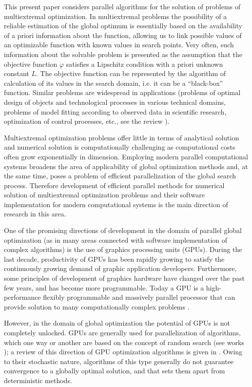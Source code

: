 \documentclass[smallcondensed]{svjour3}     %
\begin{document}
This present paper considers parallel algorithms for the solution of problems of multiextremal optimization. In multiextremal problems the possibility of a reliable estimation of the global optimum is essentially based on the availability of a priori information about the function, allowing us to link possible values of an optimizable function with known values in search points. Very often, such information about the solvable problem is presented as the assumption that the objective function $\varphi$ satisfies a Lipschitz condition with a priori unknown constant $L$. The objective function can be represented by the algorithm of calculation of its values in the search domain, i.e. it can be a ``black-box'' function. Similar problems are widespread in applications (problems of optimal design of objects and technological processes in various technical domains, problems of model fitting according to observed data in scientific research, optimization of control processes, etc., see the review \cite{RefPinter}).

Multiextremal optimization problems offer little in terms of analytical solution and numerical solution is computationally challenging as computational costs often grow exponentially in dimension. Employing modern parallel computational systems broadens the area of applicability of global optimization methods and, at the same time, poses a problem of efficient parallelization of the global search process. Therefore development of efficient parallel methods for numerical solution of multiextremal optimization problems and their software implementation for modern computational systems is the main direction of research in this area.

One of the promising directions of development in the domain of parallel global optimization (as in many areas connected with software implementation of complex algorithms) is the use of graphics processing units (GPUs). During the last decade, productivity of GPUs has been rapidly growing to satisfy the continuously growing demand of graphic application developers. Furthermore, some principles of development of graphics hardware have changed over the past few years, and has become more programmable. Today a GPU is a high-performance flexibly programmable and massively parallel processor that can provide solution to many computationally complex problems \cite{RefHwu}.

However, in the domain of global optimization the potential of GPUs is not completely unlocked. GPUs are generally used for parallelization of algorithms, which one way or another are based on the concept of random search (see works \cite{RefFerreiro,RefZhu,RefGarcia,RefMussi}); a review of this direction of GPU optimization algorithms is given in \cite{RefLangdon}. Owing to their stochastic nature, algorithms of this type generally do not guarantee convergence to a globally optimal solution, and that sets them apart from deterministic methods.
\end{document}

